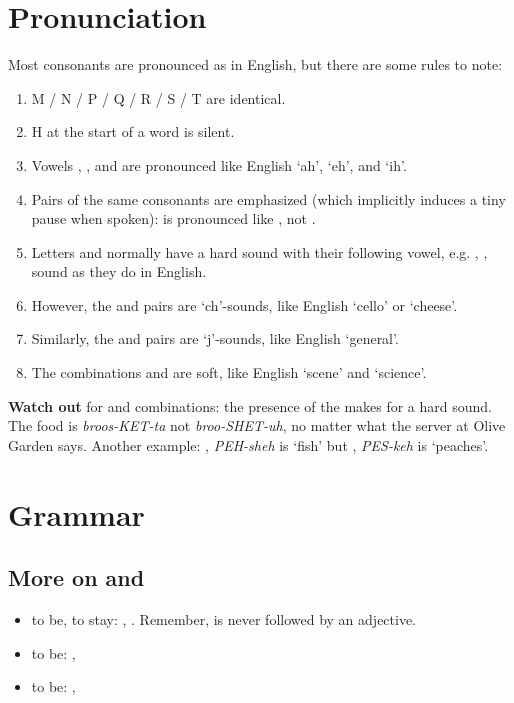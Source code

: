 \section{Pronunciation} \label{0131-Pronunciation}
Most consonants are pronounced as in English, but there are some rules to note:
\begin{enumerate}
    \item M / N / P / Q / R / S / T are identical.
    \item H at the start of a word is silent.
    \item Vowels , , and  are pronounced like English `ah', `eh', and `ih'.
    \item Pairs of the same consonants are emphasized (which implicitly induces a tiny pause 
	    when spoken):  is pronounced like , not .
    \item Letters  and  normally have a hard sound with their following vowel, 
	    e.g. , ,  sound as they do in English.
    \item However, the  and  pairs are `ch'-sounds, like English `cello' or `cheese'.
    \item Similarly, the  and  pairs are `j'-sounds, like English `general'.
    \item The combinations  and  are soft, like English `scene' and `science'.
\end{enumerate}
\begin{mdframed}
    \textbf{Watch out} for  and  combinations: the presence of the  makes 
	for a hard sound. The food  is \textit{broos-KET-ta} not 
	\textit{broo-SHET-uh}, no matter what the server at Olive Garden says. Another example: 
	, \textit{PEH-sheh} is `fish' but , \textit{PES-keh} is `peaches'.
\end{mdframed}

\section{Grammar} \label{0131-Grammar}
\subsection{More on  and }
\begin{itemize}[nosep]
    \item {} to be, to stay: , . 
	    Remember,  is never followed by an adjective.
    \item {} to be: , 
    \item {} to be: , 
\end{itemize}

